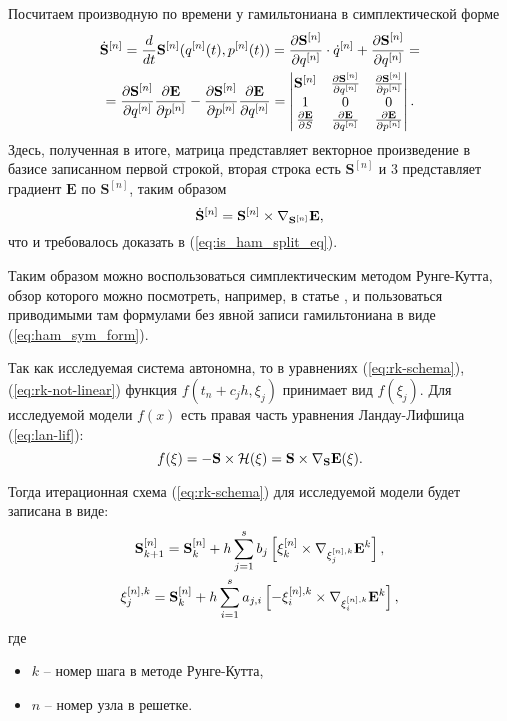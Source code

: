 Посчитаем производную по времени у гамильтониана в симплектической
форме
\begin{multline}\label{eq:ham-deriv-matrix}
    \dot{\mathbf S}^{[n]} = \frac{d}{dt}\mathbf S^{[n]}(q^{[n]}(t),p^{[n]}(t))=
    \frac{\partial \mathbf S^{[n]}}{\partial q^{[n]}} \cdot \dot q^{[n]} +
    \frac{\partial \mathbf S^{[n]}}{\partial q^{[n]}}
    =\\=
    \frac{\partial \mathbf S^{[n]}}{\partial q^{[n]}}
    \frac{\partial \mathbf E}{\partial p^{[n]}}
    -
    \frac{\partial \mathbf S^{[n]}}{\partial p^{[n]}}
    \frac{\partial \mathbf E}{\partial q^{[n]}}
    =
    \left|\begin{matrix}
        \mathbf{S}^{[n]} & \frac{\partial \mathbf{S}^{[n]}}{\partial q^{[n]}} &
        \frac{\partial \mathbf{S}^{[n]}}{\partial p^{[n]}}
        \\
        1 & 0 & 0
        \\
        \frac{\partial \mathbf E}{\partial S} &
        \frac{\partial \mathbf E}{\partial q^{[n]}} &
        \frac{\partial \mathbf E}{\partial p^{[n]}}
    \end{matrix}\right|.
\end{multline}
Здесь, полученная в итоге, матрица представляет векторное произведение в базисе
записанном первой строкой, вторая строка есть $\mathbf S^{[n]}$ и 3 представляет
градиент $\mathbf E$ по $\mathbf S^{[n]}$, таким образом
\begin{equation}
    \dot{\mathbf S}^{[n]} = \mathbf{S}^{[n]} \times \nabla_{\mathbf{S}^{[n]}}\mathbf E,
\end{equation}
что и требовалось доказать в (\ref{eq:is_ham_split_eq}).

Таким образом можно воспользоваться симплектическим методом Рунге-Кутта,
обзор которого можно посмотреть, например, в статье
\cite{survey-on-symplectic-integrators},
и пользоваться приводимыми там
формулами без явной записи гамильтониана в виде (\ref{eq:ham_sym_form}).


Так как исследуемая система автономна, то в уравнениях (\ref{eq:rk-schema}),
(\ref{eq:rk-not-linear})
функция $f(t_n + c_jh, \xi_j)$ принимает вид $f(\xi_j)$.
Для исследуемой модели $f(x)$ есть правая часть уравнения Ландау-Лифшица
(\ref{eq:lan-lif}):
\begin{equation}
    f(\xi) = -\mathbf S \times \mathcal{H}(\xi) = \mathbf S \times \nabla_{\mathbf S}
    \mathbf E(\xi).
\end{equation}

Тогда итерационная схема (\ref{eq:rk-schema}) для исследуемой
модели будет записана в виде:
\begin{gather}
    \mathbf S^{[n]}_{k+1} = \mathbf{S}^{[n]}_k + h\sum_{j=1}^s b_j \left[\xi^{[n]}_k \times
    \nabla_{\xi^{[n],k}_j} \mathbf E^k \right],
    \\
    \xi_j^{[n], k} = \mathbf{S}^{[n]}_k + h\sum_{i=1}^s a_{j,i} \left[ -\xi_i^{[n],k}
    \times \nabla_{\xi^{[n],k}_i} \mathbf E^k \right]\label{eq:rk-not-linear},
\end{gather}
где
\begin{itemize}
    \item $k$ -- номер шага в методе Рунге-Кутта,
    \item $n$ -- номер узла в решетке.
\end{itemize}

